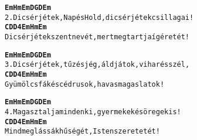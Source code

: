 \begin{minipage}{\textwidth}
\kottastart
{}
\kottaend
\begin{minipage}{\textwidth}
\begin{alltt}
\textbf{    Em           Hm     Em    D     G      D     Em}
2. Dicsérjétek, Nap és Hold, dicsérjétek csillagai!
\textbf{    C     D      D4     Em                 Hm    Em}
   Dicsérjétek szent nevét, mert megtartja ígéretét!
\end{alltt}
\vspace{0.0cm}
\versszakspacing
\end{minipage}
\begin{minipage}{\textwidth}
\begin{alltt}
\textbf{    Em           Hm     Em  D     G    D         Em}
3. Dicsérjétek, tűz és jég, áldjátok, vihar és szél,
\textbf{     C      D      D4   Em         Hm     Em}
   Gyümölcsfák és cédrusok, havas magaslatok!
\end{alltt}
\vspace{0.0cm}
\versszakspacing
\end{minipage}
\begin{minipage}{\textwidth}
\begin{alltt}
\textbf{    Em          Hm    Em   D    G     D      Em}
4. Magasztalja mindenki, gyermekek és öregek is!
\textbf{    C       D      D4  Em          Hm    Em}
   Mind meglássák hűségét, Isten szeretetét!
\end{alltt}
\vspace{0.0cm}
\versszakspacing
\end{minipage}
\end{minipage}
~\vspace{1.0cm}
\newline

